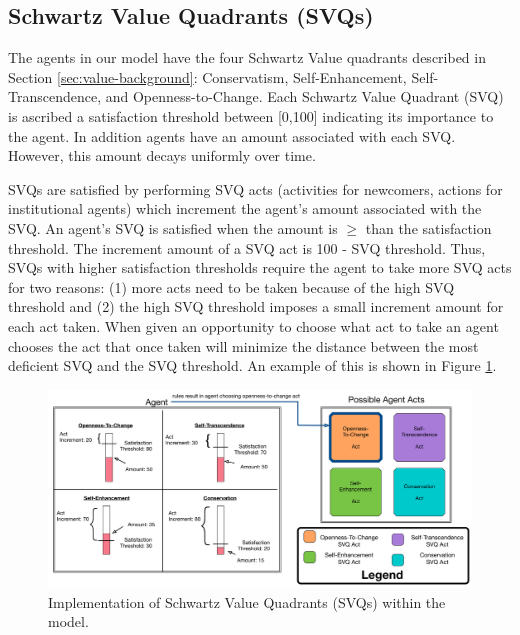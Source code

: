 \documentclass{scspaperproc}
\theoremstyle{scsthe}
\begin{document}
\subsection{Schwartz Value Quadrants (SVQs)}
The agents in our model have the four Schwartz Value quadrants described in Section \ref{sec:value-background}: Conservatism, Self-Enhancement, Self-Transcendence, and Openness-to-Change. Each Schwartz Value Quadrant (SVQ) is ascribed a satisfaction threshold between [0,100] indicating its importance to the agent. In addition agents have an amount associated with each SVQ. However, this amount decays uniformly over time. 

SVQs are satisfied by performing SVQ acts (activities for newcomers, actions for institutional agents) which increment the agent's amount associated with the SVQ. An agent's SVQ is satisfied when the amount is $\geq$ than the satisfaction threshold. The increment amount of a SVQ act is 100 - SVQ threshold. Thus, SVQs with higher satisfaction thresholds require the agent to take more SVQ acts for two reasons: (1) more acts need to be taken because of the high SVQ threshold and (2) the high SVQ threshold imposes a small increment amount for each act taken. When given an opportunity to choose what act to take an agent chooses the act that once taken will minimize the distance between the most deficient SVQ and the SVQ threshold. An example of this is shown in Figure \ref{fig:agent-val}.

\begin{figure}[htb]
{
\centering
\includegraphics[width=0.95\columnwidth]{Agent-Value-In-Model.png}
\caption{Implementation of Schwartz Value Quadrants (SVQs) within the model.}
\label{fig:agent-val}
}
\end{figure}
\end{document}
